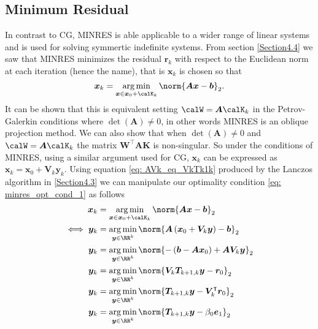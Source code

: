 \subsection{Minimum Residual}\label{Section4.6}
In contrast to CG, MINRES is able applicable to a wider range of linear systems and is used for solving symmertic indefinite systems. From section \ref{Section4.4} we saw that MINRES minimizes the residual $\bm{r}_k$ with respect to the Euclidean norm at each iteration (hence the name), that is $\bm{x}_k$ is chosen so that
\begin{equation} \label{eq: minres_opt_cond_1}
    \bm{x}_k = \argmin_{\bm{x} \in \bm{x}_0 + \calK_k} \norm{\bm{A} \bm {x} - \bm{b}}_2.
\end{equation}
It can be shown that this is equivalent setting $\calW = \bm{A} \calK_k$ in the Petrov-Galerkin conditions where $\det \left( \bm{A} \right) \neq 0$, in other words MINRES is an oblique projection method. We can also show that when $\det \left( \bm{A} \right) \neq 0$ and $\calW = \bm{A} \calK_k$ the matrix $\bm{W}^{\intercal} \bm{A} \bm{K}$ is non-singular. So under the conditions of MINRES, using a similar argument used for CG, $\bm{x}_k$ can be expressed as $\bm{x}_k = \bm{x}_0 + \bm{V}_k \bm{y}_k$. Using equation \ref{eq: AVk_eq_VkTk1k} produced by the Lanczos algorithm in \ref{Section4.3} we can manipulate our optimality condition \ref{eq: minres_opt_cond_1} as follows
\begin{align*}
    \bm{x}_k      & = \argmin_{\bm{x} \in \bm{x}_0 + \calK_k} \norm{\bm{A} \bm {x} - \bm{b}}_2                                 \\
    \iff \bm{y}_k & = \argmin_{\bm{y} \in \RR^k} \norm{\bm{A} \left( \bm{x}_0 + \bm{V}_k \bm{y} \right) - \bm{b}}_2            \\
    \bm{y}_k      & = \argmin_{\bm{y} \in \RR^k} \norm{ - \left( \bm{b} - \bm{A} \bm{x}_0 \right) + \bm{A} \bm{V}_k \bm{y} }_2 \\
    \bm{y}_k      & = \argmin_{\bm{y} \in \RR^k} \norm{ \bm{V}_{k} \bm{T}_{k+1,k} \bm{y} - \bm{r}_0 }_2                        \\
    \bm{y}_k      & = \argmin_{\bm{y} \in \RR^k} \norm{ \bm{T}_{k+1,k} \bm{y} - \bm{V}_{k}^{\intercal} \bm{r}_0 }_2            \\
    \bm{y}_k      & = \argmin_{\bm{y} \in \RR^k} \norm{ \bm{T}_{k+1,k} \bm{y} - \beta_0 \bm{e}_1 }_2
\end{align*}
